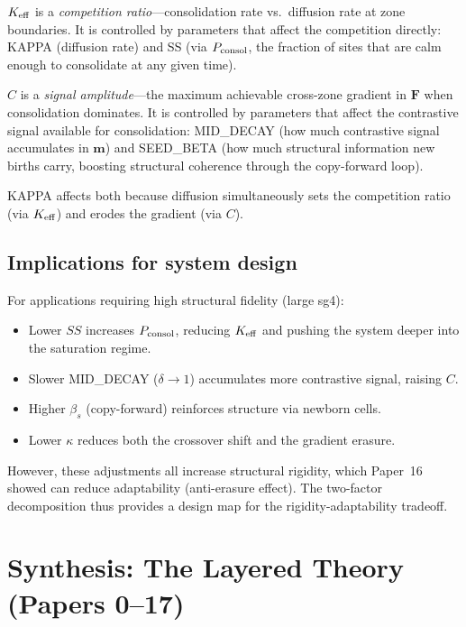 \documentclass[11pt,a4paper]{article}
\begin{document}
$K_{\rm eff}$ is a \emph{competition ratio}---consolidation rate vs.\ diffusion rate at
zone boundaries.  It is controlled by parameters that affect the competition directly:
KAPPA (diffusion rate) and SS (via $P_{\rm consol}$, the fraction of sites that are
calm enough to consolidate at any given time).

$C$ is a \emph{signal amplitude}---the maximum achievable cross-zone gradient in
$\mathbf{F}$ when consolidation dominates.  It is controlled by parameters that
affect the contrastive signal available for consolidation: MID\_DECAY (how much
contrastive signal accumulates in $\mathbf{m}$) and SEED\_BETA (how much structural
information new births carry, boosting structural coherence through the copy-forward
loop).

KAPPA affects both because diffusion simultaneously sets the competition ratio (via
$K_{\rm eff}$) and erodes the gradient (via $C$).

\subsection{Implications for system design}

For applications requiring high structural fidelity (large sg4):
\begin{itemize}
  \item Lower $SS$ increases $P_{\rm consol}$, reducing $K_{\rm eff}$ and pushing the
    system deeper into the saturation regime.
  \item Slower MID\_DECAY ($\delta\to 1$) accumulates more contrastive signal, raising
    $C$.
  \item Higher $\beta_s$ (copy-forward) reinforces structure via newborn cells.
  \item Lower $\kappa$ reduces both the crossover shift and the gradient erasure.
\end{itemize}

However, these adjustments all increase structural rigidity, which Paper~16 showed
can reduce adaptability (anti-erasure effect).  The two-factor decomposition thus
provides a design map for the rigidity-adaptability tradeoff.

\section{Synthesis: The Layered Theory (Papers 0--17)}
\end{document}

